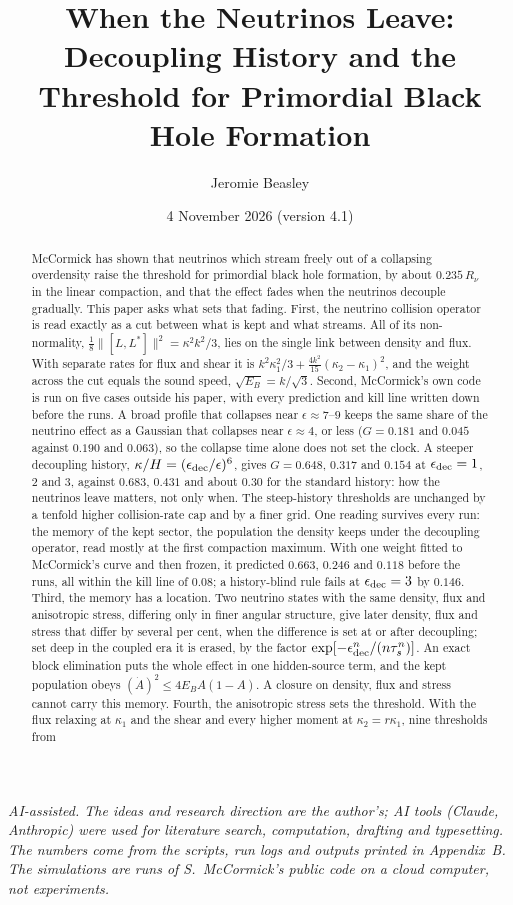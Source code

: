 \documentclass[11pt]{article}
\title{When the Neutrinos Leave:\\ Decoupling History and the Threshold for Primordial Black Hole Formation}
\author{Jeromie Beasley}
\date{4 November 2026 \quad (version 4.1)}
\begin{document}
\maketitle

\noindent\emph{AI-assisted. The ideas and research direction are the author's; AI tools (Claude, Anthropic) were used for literature search, computation, drafting and typesetting. The numbers come from the scripts, run logs and outputs printed in Appendix~B. The simulations are runs of S.~McCormick's public code on a cloud computer, not experiments.}

\begin{abstract}
McCormick has shown that neutrinos which stream freely out of a collapsing overdensity raise the threshold for primordial black hole formation, by about $0.235\,R_\nu$ in the linear compaction, and that the effect fades when the neutrinos decouple gradually. This paper asks what sets that fading. First, the neutrino collision operator is read exactly as a cut between what is kept and what streams. All of its non-normality, $\tfrac18\lVert[L,L^\ast]\rVert^2=\kappa^2k^2/3$, lies on the single link between density and flux. With separate rates for flux and shear it is $k^2\kappa_1^2/3+\tfrac{4k^2}{15}(\kappa_2-\kappa_1)^2$, and the weight across the cut equals the sound speed, $\sqrt{E_B}=k/\sqrt3$. Second, McCormick's own code is run on five cases outside his paper, with every prediction and kill line written down before the runs. A broad profile that collapses near $\epsilon\approx7$--$9$ keeps the same share of the neutrino effect as a Gaussian that collapses near $\epsilon\approx4$, or less ($G=0.181$ and $0.045$ against $0.190$ and $0.063$), so the collapse time alone does not set the clock. A steeper decoupling history, $\kappa/H=(\epsilon_{\rm dec}/\epsilon)^6$, gives $G=0.648$, $0.317$ and $0.154$ at $\epsilon_{\rm dec}=1$, $2$ and $3$, against $0.683$, $0.431$ and about $0.30$ for the standard history: how the neutrinos leave matters, not only when. The steep-history thresholds are unchanged by a tenfold higher collision-rate cap and by a finer grid. One reading survives every run: the memory of the kept sector, the population the density keeps under the decoupling operator, read mostly at the first compaction maximum. With one weight fitted to McCormick's curve and then frozen, it predicted $0.663$, $0.246$ and $0.118$ before the runs, all within the kill line of $0.08$; a history-blind rule fails at $\epsilon_{\rm dec}=3$ by $0.146$. Third, the memory has a location. Two neutrino states with the same density, flux and anisotropic stress, differing only in finer angular structure, give later density, flux and stress that differ by several per cent, when the difference is set at or after decoupling; set deep in the coupled era it is erased, by the factor $\exp[-\epsilon_{\rm dec}^n/(n\tau_s^n)]$. An exact block elimination puts the whole effect in one hidden-source term, and the kept population obeys $(\dot A)^2\le4E_BA(1-A)$. A closure on density, flux and stress cannot carry this memory. Fourth, the anisotropic stress sets the threshold. With the flux relaxing at $\kappa_1$ and the shear and every higher moment at $\kappa_2=r\kappa_1$, nine thresholds from 
\end{abstract}
\end{document}
